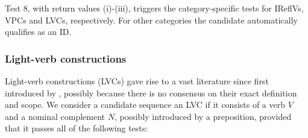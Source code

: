 \documentclass[output=paper,modfonts]{langscibook}
\begin{document}


Test 8, with return values (i)-(iii), triggers the category-specific tests for IReflVs, VPCs and LVCs, respectively. For other categories the candidate automatically qualifies as an ID.

\subsubsection{Light-verb constructions}
\label{sec:lvcs}
%
Light-verb constructions (LVCs) gave rise to a vast literature since first introduced by \citet{jespersen:65}, possibly because there is no consensus on their exact definition and scope. 
%
We consider a candidate sequence an LVC if it consists of a verb $V$ and a nominal complement $N$, possibly introduced by a preposition, provided that it passes all of the following tests:
\end{document}
